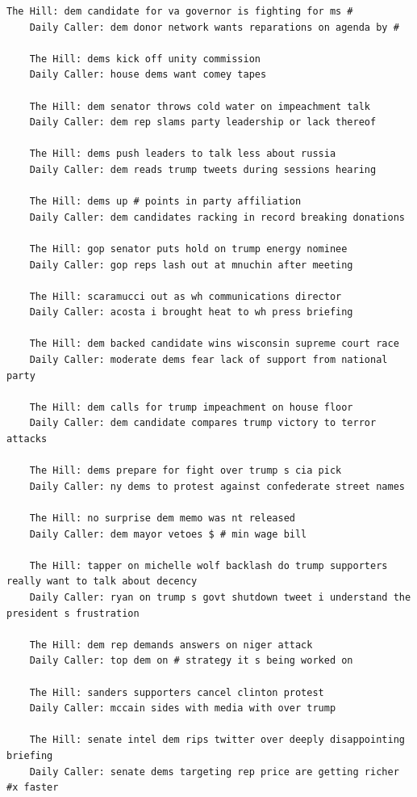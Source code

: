 \documentclass{scrartcl}
\begin{document}
\begin{lstlisting}[basicstyle=\tiny\hlfont]
    The Hill: dem candidate for va governor is fighting for ms #
    Daily Caller: dem donor network wants reparations on agenda by #

    The Hill: dems kick off unity commission
    Daily Caller: house dems want comey tapes

    The Hill: dem senator throws cold water on impeachment talk
    Daily Caller: dem rep slams party leadership or lack thereof

    The Hill: dems push leaders to talk less about russia
    Daily Caller: dem reads trump tweets during sessions hearing

    The Hill: dems up # points in party affiliation
    Daily Caller: dem candidates racking in record breaking donations

    The Hill: gop senator puts hold on trump energy nominee
    Daily Caller: gop reps lash out at mnuchin after meeting

    The Hill: scaramucci out as wh communications director
    Daily Caller: acosta i brought heat to wh press briefing

    The Hill: dem backed candidate wins wisconsin supreme court race
    Daily Caller: moderate dems fear lack of support from national party

    The Hill: dem calls for trump impeachment on house floor
    Daily Caller: dem candidate compares trump victory to terror attacks

    The Hill: dems prepare for fight over trump s cia pick
    Daily Caller: ny dems to protest against confederate street names

    The Hill: no surprise dem memo was nt released
    Daily Caller: dem mayor vetoes $ # min wage bill

    The Hill: tapper on michelle wolf backlash do trump supporters really want to talk about decency
    Daily Caller: ryan on trump s govt shutdown tweet i understand the president s frustration

    The Hill: dem rep demands answers on niger attack
    Daily Caller: top dem on # strategy it s being worked on

    The Hill: sanders supporters cancel clinton protest
    Daily Caller: mccain sides with media with over trump

    The Hill: senate intel dem rips twitter over deeply disappointing briefing
    Daily Caller: senate dems targeting rep price are getting richer #x faster


\end{lstlisting}
\end{document}
